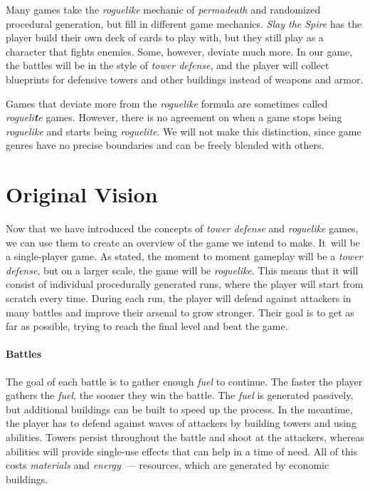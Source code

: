 Many games take the \emph{roguelike} mechanic of \emph{permadeath} and randomized procedural generation, but fill in different game mechanics.
\emph{Slay the Spire} has the player build their own deck of cards to play with, but they still play as a character that fights enemies.
Some, however, deviate much more.
In our game, the battles will be in the style of \emph{tower defense}, and the player will collect blueprints for defensive towers and other buildings instead of weapons and armor.

Games that deviate more from the \emph{roguelike} formula are sometimes called \emph{rogueli\textbf{t}e} games.
However, there is no agreement on when a game stops being \emph{roguelike} and starts being \emph{roguelite}.
We will not make this distinction, since game genres have no precise boundaries and can be freely blended with others.

\section{Original Vision} \label{sec:original-vision}

Now that we have introduced the concepts of \emph{tower defense} and \emph{roguelike} games, we can use them to create an overview of the game we intend to make.
It~will be a single-player game.
As stated, the moment to moment gameplay will be a \emph{tower defense}, but on a larger scale, the game will be \emph{roguelike}.
This means that it will consist of individual procedurally generated runs, where the player will start from scratch every time.
During each run, the player will defend against attackers in many battles and improve their arsenal to grow stronger.
Their goal is to get as far as possible, trying to reach the final level and beat the game.

\paragraph*{Battles}\label{ov-par:battles}\hfill\break
The goal of each battle is to gather enough \emph{fuel} to continue.
The faster the player gathers the \emph{fuel}, the sooner they win the battle.
The \emph{fuel} is generated passively, but additional buildings can be built to speed up the process.
In the meantime, the player has to defend against waves of attackers by building towers and using abilities.
Towers persist throughout the battle and shoot at the attackers, whereas abilities will provide single-use effects that can help in a time of need.
All of this costs \emph{materials} and \emph{energy}~--- resources, which are generated by economic buildings.

